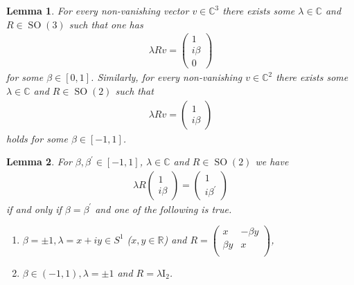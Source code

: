 \documentclass[10pt,a4paper]{amsart}
\newtheorem{lemma}{Lemma}
\newcommand{\C}{\mathbb{C}}
\newcommand{\R}{\mathbb{R}}
\DeclareMathOperator{\SO}{SO}
\begin{document}
\begin{lemma}
    \label{lin::lemma:existence_of_index_beta_for_lines_in_C3}
        For every non-vanishing vector $v \in \C^3$ there exists some $\lambda \in \C$ and $R \in \SO(3)$ such that one has
        \begin{align*}
            \lambda R v = \begin{pmatrix}
                1 \\ i \beta \\ 0
            \end{pmatrix}
        \end{align*}
        for some $\beta \in [0,1]$. Similarly, for every non-vanishing $v \in \C^2$ there exists some $\lambda \in \C$ and $R \in \SO(2)$ such that
        \begin{align*}
            \lambda R v = \begin{pmatrix}
                1 \\ i \beta
            \end{pmatrix}
        \end{align*}
        holds for some $\beta \in [-1,1]$.
\end{lemma}

\begin{lemma}
    \label{lin::lemma:uniqueness_of_lambda_in_C2}
    For $\beta, \beta^\prime \in [-1,1]$, $\lambda \in \C$ and $R \in \SO(2)$ we have
    \begin{align}
    \label{dir::eq:beta_beta_prime_are_index_of_the_same_line_in_C2}
        \lambda R \begin{pmatrix}
            1 \\ i \beta
        \end{pmatrix}
        = \begin{pmatrix}
            1 \\ i \beta^\prime
        \end{pmatrix}
    \end{align}
    if and only if $\beta = \beta^\prime$ and one of the following is true.
    \begin{enumerate}[label=(\alph*)]
        \item\label{lin::item:beta_beta_prime_are_index_of_the_same_line_in_C2:a} $\beta = \pm 1, \lambda = x + iy \in S^1$ ($x, y \in \R$) and $\displaystyle R = \begin{pmatrix}
            x & -\beta y \\
            \beta y & x \\
        \end{pmatrix}$,
        \item\label{lin::item:beta_beta_prime_are_index_of_the_same_line_in_C2:b} $\beta \in (-1,1), \lambda = \pm 1$ and $\displaystyle R = \lambda \mathrm{I}_2$.
    \end{enumerate}
\end{lemma}
\end{document}
